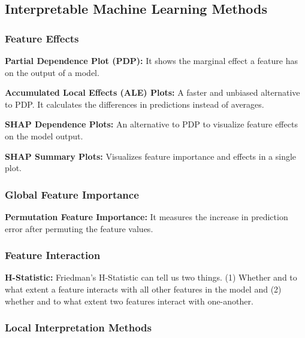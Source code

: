\documentclass[
]{article}
\begin{document}
\hypertarget{interpretable-machine-learning-methods}{%
\subsection{Interpretable Machine Learning Methods}\label{interpretable-machine-learning-methods}}

\hypertarget{feature-effects}{%
\subsubsection{Feature Effects}\label{feature-effects}}

\textbf{Partial Dependence Plot (PDP):} It shows the marginal effect a feature has on the output of a model.

\textbf{Accumulated Local Effects (ALE) Plots:} A faster and unbiased alternative to PDP. It calculates the differences in predictions instead of averages.

\textbf{SHAP Dependence Plots:} An alternative to PDP to visualize feature effects on the model output.

\textbf{SHAP Summary Plots:} Visualizes feature importance and effects in a single plot.

\hypertarget{global-feature-importance}{%
\subsubsection{Global Feature Importance}\label{global-feature-importance}}

\textbf{Permutation Feature Importance:} It measures the increase in prediction error after permuting the feature values.

\hypertarget{feature-interaction}{%
\subsubsection{Feature Interaction}\label{feature-interaction}}

\textbf{H-Statistic:} Friedman's H-Statistic can tell us two things. (1) Whether and to what extent a feature interacts with all other features in the model and (2) whether and to what extent two features interact with one-another.

\hypertarget{local-interpretation-methods}{%
\subsubsection{Local Interpretation Methods}\label{local-interpretation-methods}}
\end{document}
